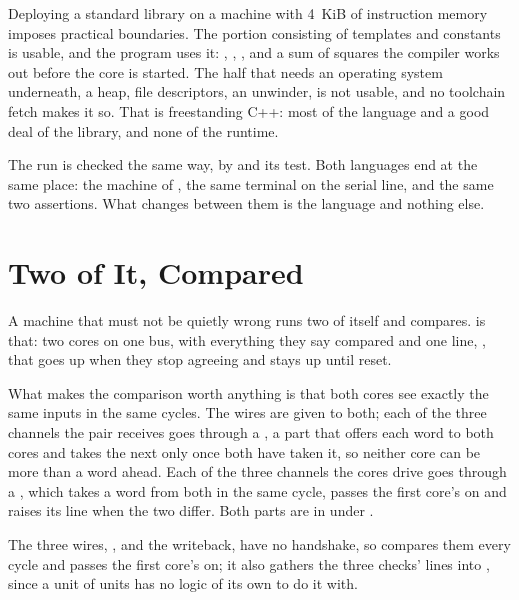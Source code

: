 \documentclass[journal,onecolumn,9pt]{IEEEtran}
\begin{document}
Deploying a standard library on a machine with 4~KiB of
instruction memory imposes practical boundaries. The portion
consisting of templates and constants is usable, and the program uses
it: , , ,
and a sum of squares the compiler works out before the core is
started. The half that needs an operating system underneath, a heap,
file descriptors, an unwinder, is not usable, and no toolchain fetch
makes it so. That is freestanding C++: most of the language and a
good deal of the library, and none of the runtime.



The run is checked the same way, by 
and its test. Both languages end at the same place: the machine of
, the same terminal on the serial line, and the same
two assertions. What changes between them is the language and
nothing else.

\section{Two of It, Compared}
\label{sec:v-pair}

A machine that must not be quietly wrong runs two of itself and
compares.  is that: two  cores on one bus,
with everything they say compared and one line, , that
goes up when they stop agreeing and stays up until reset.

What makes the comparison worth anything is that both cores see
exactly the same inputs in the same cycles. The wires are given to
both; each of the three channels the pair receives goes through a
, a part that offers each word to both cores and takes the next
only once both have taken it, so neither core can be more than a
word ahead. Each of the three
channels the cores drive goes through a , which takes a
word from both in the same cycle, passes the first core's on and
raises its line when the two differ. Both parts are in
 under .

The three wires, ,  and the writeback, have no
handshake, so  compares them every cycle and passes the
first core's on; it also gathers the three checks' lines into
, since a unit of units has no logic of its own to do it
with.
\end{document}
